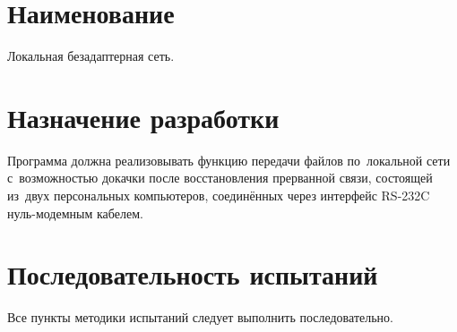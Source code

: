 \documentclass[a4paper,12pt]{article}
\begin{document}
\section{Наименование}
Локальная безадаптерная сеть.

\section{Назначение разработки}
Программа должна реализовывать функцию передачи файлов по~локальной сети с~возможностью докачки после восстановления прерванной связи, состоящей из~двух персональных компьютеров, соединённых через интерфейс RS-232C нуль-модемным кабелем.

\section{Последовательность испытаний}
Все пункты методики испытаний следует выполнить последовательно.
\end{document}
